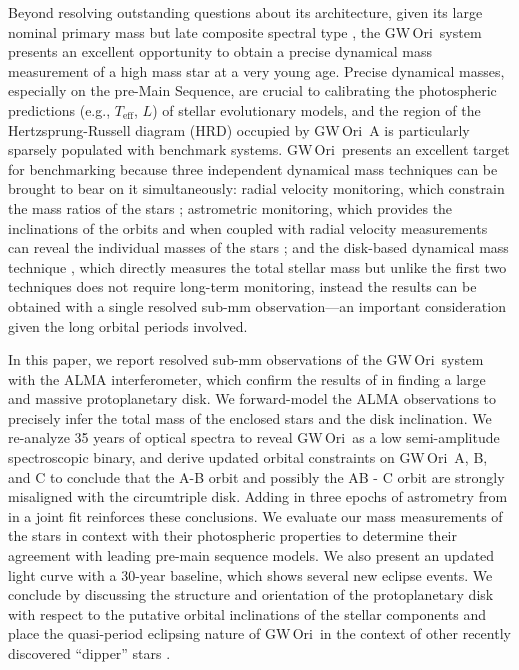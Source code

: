 \documentclass[twocolumn]{aastex61}
\newcommand{\todo}[1]{ \textcolor{red}{#1}}
\newcommand{\obj}{GW\,Ori}
\begin{document}
Beyond resolving outstanding questions about its architecture, given its large nominal primary mass but late composite spectral type \citep[$M_\mathrm{A} = 3.9\,M_\odot$, SpT = G8;][]{fang14,fang17}, the \obj\ system presents an excellent opportunity to obtain a precise dynamical mass measurement of a high mass star at a very young age. Precise dynamical masses, especially on the pre-Main Sequence, are crucial to calibrating the photospheric predictions (e.g., $T_\mathrm{eff}$, $L$) of stellar evolutionary models, and the region of the Hertzsprung-Russell diagram (HRD) occupied by \obj~A is particularly sparsely populated with benchmark systems. \obj\ presents an excellent target for benchmarking because three independent dynamical mass techniques can be brought to bear on it simultaneously:
radial velocity monitoring, which constrain the mass ratios of the stars \citep{mathieu91,fang14}; astrometric monitoring, which provides the inclinations of the orbits and when coupled with radial velocity measurements can reveal the individual masses of the stars \citep{berger11};
and the disk-based dynamical mass technique \citep[e.g.,][]{rosenfeld12b,czekala15a,czekala16}, which directly measures the total stellar mass but unlike the first two techniques does not require long-term monitoring, instead the results can be obtained with a single resolved sub-mm observation---an important consideration given the long orbital periods involved.

In this paper, we report resolved sub-mm observations of the \obj\ system with the ALMA interferometer, which confirm the results of \citet{fang17} in finding a large and massive protoplanetary disk. We forward-model the ALMA observations to precisely infer the total mass of the enclosed stars and the disk inclination. We re-analyze 35 years of optical spectra to reveal \obj\ as a low semi-amplitude spectroscopic binary, and derive updated orbital constraints on \obj\ A, B, and C to conclude that the A-B orbit and possibly the AB - C orbit are strongly misaligned with the circumtriple disk. Adding in three epochs of astrometry from \citet{berger11} in a joint fit reinforces these conclusions. We evaluate our mass measurements of the stars in context with their photospheric properties to determine their agreement with leading pre-main sequence models. We also present an updated light curve with a 30-year baseline, which shows several new eclipse events. We conclude by discussing the structure and orientation of the protoplanetary disk with respect to the putative orbital inclinations of the stellar components and place the quasi-period eclipsing nature of \obj\ in the context of other recently discovered ``dipper'' stars \citep[e.g.,][]{ansdell16b,ansdell16a}.
\end{document}
